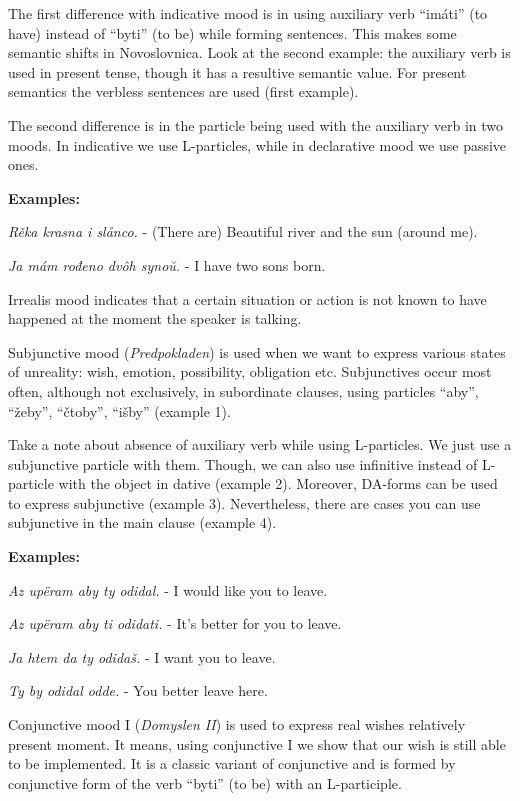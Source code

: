 The first difference with indicative mood is in using auxiliary verb “imáti” (to have) instead of “byti” (to be) while forming sentences. This makes some semantic shifts in Novoslovnica. Look at the second example: the auxiliary verb is used in present tense, though it has a resultive semantic value. For present semantics the verbless sentences are used (first example).

The second difference is in the particle being used with the auxiliary verb in two moods. In indicative we use L-particles, while in declarative mood we use passive ones.

\textbf{Examples:}

\textit{Rěka krasna i slånco.} - (There are) Beautiful river and the sun (around me).

\textit{Ja mám rođeno dvôh synoŭ.} - I have two sons born.

Irrealis mood indicates that a certain situation or action is not known to have happened at the moment the speaker is talking. 

Subjunctive mood (\textit{Predpokladen}) is used when we want to express various states of unreality: wish, emotion, possibility, obligation etc. Subjunctives occur most often, although not exclusively, in subordinate clauses, using particles “aby”, “žeby”, “čtoby”, “išby” (example 1).

Take a note about absence of auxiliary verb while using L-particles. We just use a subjunctive particle with them. Though, we can also use infinitive instead of L-particle with the object in dative (example 2). Moreover, DA-forms can be used to express subjunctive (example 3). Nevertheless, there are cases you can use subjunctive in the main clause (example 4). 

\textbf{Examples:}

\textit{Az upëram aby ty odidal.} - I would like you to leave.

\textit{Az upëram aby ti odidati.} - It’s better for you to leave.

\textit{Ja htem da ty odidaš.} - I want you to leave.

\textit{Ty by odidal odde.} - You better leave here.

Conjunctive mood I (\textit{Domyslen II}) is used to express real wishes relatively present moment. It means, using conjunctive I we show that our wish is still able to be implemented. It is a classic variant of conjunctive and is formed by conjunctive form of the verb “byti” (to be) with an L-participle.

